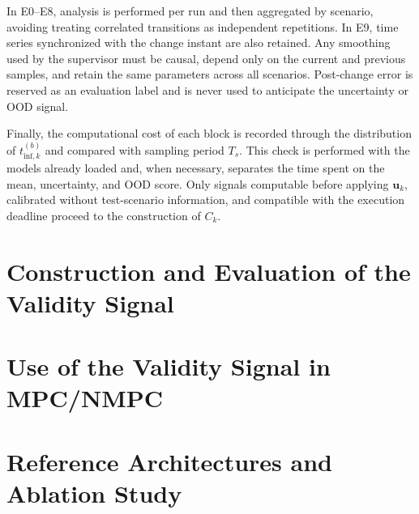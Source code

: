 \documentclass[12pt,a4paper]{report}
\begin{document}
In E0--E8, analysis is performed per run and then aggregated by scenario, avoiding treating correlated transitions as independent repetitions. In E9, time series synchronized with the change instant are also retained. Any smoothing used by the supervisor must be causal, depend only on the current and previous samples, and retain the same parameters across all scenarios. Post-change error is reserved as an evaluation label and is never used to anticipate the uncertainty or OOD signal.

Finally, the computational cost of each block is recorded through the distribution of $t^{(b)}_{\mathrm{inf},k}$ and compared with sampling period $T_s$. This check is performed with the models already loaded and, when necessary, separates the time spent on the mean, uncertainty, and OOD score. Only signals computable before applying $\mathbf u_k$, calibrated without test-scenario information, and compatible with the execution deadline proceed to the construction of $C_k$.

\section{Construction and Evaluation of the Validity Signal}

%

\section{Use of the Validity Signal in MPC/NMPC}


\section{Reference Architectures and Ablation Study}
\end{document}
